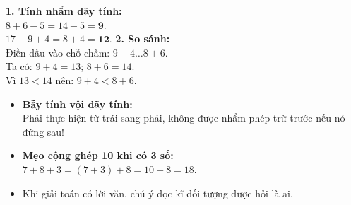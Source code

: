 \documentclass[11pt,a4paper]{article}
\begin{document}
\vspace{-1.5mm}
\noindent
\begin{minipage}[t]{0.49\textwidth}\vspace{0pt}
\begin{tcolorbox}[
  enhanced,
  colback=green!4!white,
  colframe=green!60!black,
  arc=2mm, boxrule=0.8pt,
  left=2mm, right=2mm, top=1.8mm, bottom=1.8mm,
  title={\footnotesize\bfseries\color{white}\faCheckCircle\ 4. Ví dụ thực hành chuẩn mực}
]
{\footnotesize
\textbf{1. Tính nhẩm dãy tính:}\\
$8 + 6 - 5 = 14 - 5 = \mathbf{9}$.\\
$17 - 9 + 4 = 8 + 4 = \mathbf{12}$.
\textbf{2. So sánh:}\\
Điền dấu vào chỗ chấm: $9 + 4 \dots 8 + 6$.\\
Ta có: $9 + 4 = 13$; $8 + 6 = 14$.\\
Vì $13 < 14$ nên: $9 + 4 < 8 + 6$.
}
\end{tcolorbox}
\end{minipage}
\hfill
\begin{minipage}[t]{0.49\textwidth}\vspace{0pt}
\begin{tcolorbox}[
  enhanced,
  colback=red!4!white,
  colframe=red!75!black,
  arc=2mm, boxrule=0.8pt,
  left=2mm, right=2mm, top=1.8mm, bottom=1.8mm,
  title={\footnotesize\bfseries\color{white}\faExclamationTriangle\ 5. Mẹo tránh bẫy trắc nghiệm}
]
{\footnotesize
\begin{itemize}\setlength{\itemsep}{1pt}\setlength{\leftskip}{-2.5mm}
  \item \textbf{Bẫy tính vội dãy tính:}\\
  Phải thực hiện từ trái sang phải, không được nhẩm phép trừ trước nếu nó đứng sau!
  \item \textbf{Mẹo cộng ghép 10 khi có 3 số:}\\
  $7 + 8 + 3 = (7 + 3) + 8 = 10 + 8 = 18$.
  \item Khi giải toán có lời văn, chú ý đọc kĩ đối tượng được hỏi là ai.
\end{itemize}
}
\end{tcolorbox}
\end{minipage}
\end{document}
